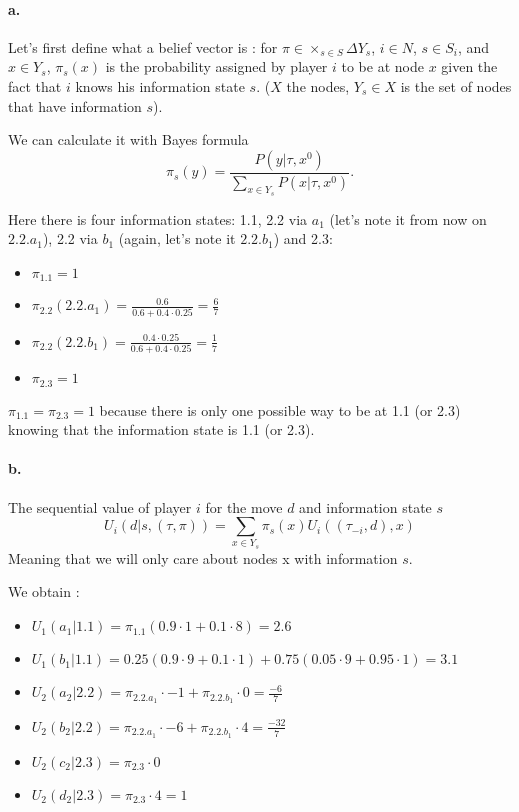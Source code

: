 \paragraph{a.} Let's first define what a belief vector is : for $\pi \in  \times_{s \in S} \Delta Y_s $, $i \in N$, $s \in S_i$, and $x \in Y_s$, $\pi_s(x)$ is the probability assigned by player $i$ to be at node $x$ given the fact that $i$ knows his information state $s$. ($X$ the nodes, $Y_s\in X$ is the set of nodes that have information $s$). 

We can calculate it with Bayes formula $$ \pi_s(y) = \frac{P(y | \tau, x^0)}{\sum_{x \in Y_s} P(x | \tau, x^0)}. $$

Here there is four information states: 1.1, 2.2 via $a_1$ (let's note it from now on $2.2.a_1$), 2.2 via $b_1$ (again, let's note it $2.2.b_1$) and 2.3: 

\begin{itemize}
\item $\pi_{1.1}= 1$ 
\item $\pi_{2.2}(2.2.a_1) = \frac{0.6}{0.6+0.4 \cdot 0.25} = \frac{6}{7}$
\item $\pi_{2.2}(2.2.b_1)= \frac{0.4\cdot 0.25}{0.6+0.4 \cdot 0.25} = \frac{1}{7}$ 
\item $\pi_{2.3}     = 1 $
\end{itemize}
$\pi_{1.1}=\pi_{2.3} = 1$ because there is only one possible way to be at 1.1 (or 2.3) knowing that the information state is 1.1 (or 2.3).

\paragraph{b.} The sequential value of player $i$ for the move $d$ and information state $s$ $$ U_i(d| s, (\tau, \pi) ) = \sum_{x \in Y_s} \pi_s(x) U_i((\tau_{-i}, d), x)$$
Meaning that we will only care about nodes x with information $s$. 

We obtain : 
\begin{itemize}
\item $U_1(a_1|1.1) = \pi_{1.1} (0.9 \cdot 1 + 0.1 \cdot 8) = 2.6$
\item $U_1(b_1|1.1) = 0.25 (0.9 \cdot 9 + 0.1 \cdot 1) + 0.75 (0.05 \cdot 9 + 0.95 \cdot 1) = 3.1$
\item $U_2(a_2|2.2) = \pi_{2.2.a_1} \cdot -1 + \pi_{2.2.b_1} \cdot 0 = \frac{-6}{7}$
\item $U_2(b_2|2.2) = \pi_{2.2.a_1} \cdot -6 + \pi_{2.2.b_1} \cdot 4 = \frac{-32}{7}$
\item $U_2(c_2|2.3) = \pi_{2.3} \cdot 0 $
\item $U_2(d_2|2.3) = \pi_{2.3} \cdot 4 = 1$
\end{itemize}

